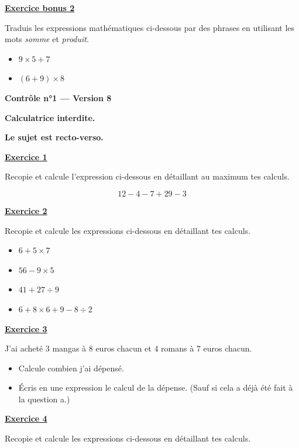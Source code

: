 \documentclass[13pt]{extarticle}
\newcommand{\exo}[1]{%
  \vspace{0.8em}%
  \noindent\large\underline{\textbf{Exercice #1}}%
  \vspace{0.2em}\par%
}
\newcommand{\exobonus}[1]{%
  \vspace{0.8em}%
  \noindent\large\underline{\textbf{Exercice bonus #1}}%
  \vspace{0.2em}\par%
}
\newcommand{\entetecontrole}[1]{%
\begin{center}
\textbf{\huge{Contrôle n°1 --- Version #1}}
\end{center}

\begin{center}
\textbf{Calculatrice interdite.}\par
\textbf{Le sujet est recto-verso.}

\end{center}
}
\begin{document}
\exobonus{2}

\noindent Traduis les expressions mathématiques ci-dessous par des phrases en utilisant les mots \emph{somme} et \emph{produit}.

\begin{itemize}
  \item[a)] $9 \times 5 + 7$
  \item[b)] $(6 + 9) \times 8$
\end{itemize}

\newpage

\entetecontrole{8}
\exo{1}

\noindent Recopie et calcule l'expression ci-dessous en détaillant au maximum tes calculs.

\[
12 - 4 - 7 + 29 - 3
\]

\exo{2}

\noindent Recopie et calcule les expressions ci-dessous en détaillant tes calculs.

\begin{itemize}
  \item[a)] $6 + 5 \times 7$
  \item[b)] $56 - 9 \times 5$
  \item[c)] $41 + 27 \div 9$
  \item[d)] $6 + 8 \times 6 + 9 - 8 \div 2$
\end{itemize}

\exo{3}

\noindent J'ai acheté 3 mangas à 8 euros chacun et 4 romans à 7 euros chacun.

\begin{itemize}
  \item[a)] Calcule combien j'ai dépensé.
  \item[b)] Écris en une expression le calcul de la dépense. (Sauf si cela a déjà été fait à la question a.)
\end{itemize}

\exo{4}

\noindent Recopie et calcule les expressions ci-dessous en détaillant tes calculs.
\end{document}
